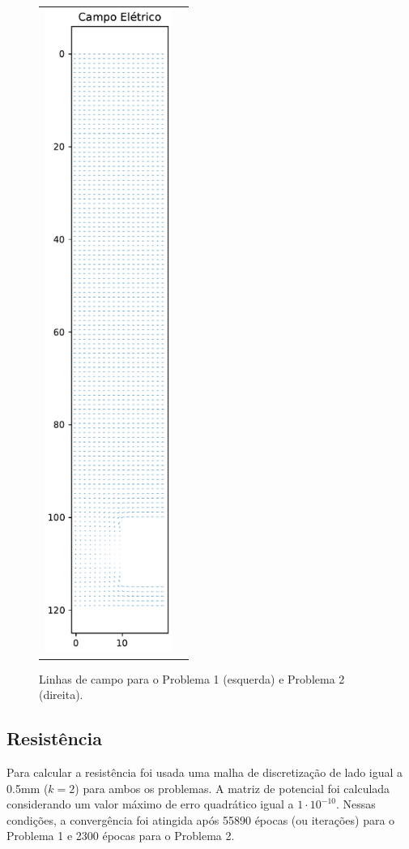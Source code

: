\documentclass{aleph-revista}
\begin{document}
\begin{figure}[!ht]
\begin{tabular}{cc}
    \includegraphics[height=210mm]{p2_campo_eletrico}
  \end{tabular}
  \caption{Linhas de campo para o Problema 1 (esquerda) e Problema 2 (direita).}
  \label{fig:campo}
\end{figure}


\newpage
\subsection{Resistência}

Para calcular a resistência foi usada uma malha de discretização de lado igual a 0.5mm ($k=2$) para ambos os problemas. A matriz de potencial foi calculada considerando um valor máximo de erro quadrático igual a $1 \cdot 10^{-10}$. Nessas condições, a convergência foi atingida após 55890 épocas (ou iterações) para o Problema 1 e 2300 épocas para o Problema 2.
\end{document}

